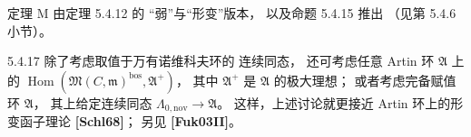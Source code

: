 定理 M
由定理 5.4.12 的
“弱”与“形变”版本，
以及命题 5.4.15 推出
（见第 5.4.6 小节）。

\begin{remark}{5.4.17}\label{rem:5-4-17}
除了考虑取值于万有诺维科夫环的
连续同态，
还可考虑任意
Artin 环 $\mathfrak A$
上的
$\operatorname{Hom}
(\mathfrak M(C,\mathfrak m)^{\mathrm{bos}},
\mathfrak A^+)$，
其中 $\mathfrak A^+$
是 $\mathfrak A$ 的极大理想；
或者考虑完备赋值环
$\mathfrak A$，
其上给定连续同态
$\Lambda_{0,\mathrm{nov}}\to\mathfrak A$。
这样，上述讨论就更接近
Artin 环上的形变函子理论
\textbf{[Schl68]}；
另见 \textbf{[Fuk03II]}。
\end{remark}
